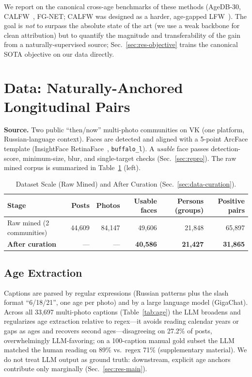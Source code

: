 \documentclass[journal]{IEEEtran}
\begin{document}
We report on the canonical cross-age benchmarks of these methods (AgeDB-30, CALFW~\cite{zheng2017calfw}, FG-NET; CALFW was designed as a harder, age-gapped LFW~\cite{huang2007lfw}). The goal is \emph{not} to surpass the absolute state of the art (we use a weak backbone for clean attribution) but to quantify the magnitude and transferability of the gain from a naturally-supervised source; Sec.~\ref{sec:res-objective} trains the canonical SOTA objective on our data directly.

\section{Data: Naturally-Anchored Longitudinal Pairs}\label{sec:data}
\textbf{Source.} Two public ``then/now'' multi-photo communities on VK (one platform, Russian-language context). Faces are detected and aligned with a 5-point ArcFace template (InsightFace RetinaFace~\cite{deng2020retinaface}, \texttt{buffalo\_l}). A \emph{usable} face passes detection-score, minimum-size, blur, and single-target checks (Sec.~\ref{sec:repro}). The raw mined corpus is summarized in Table~\ref{tab:scale} (left).

\begin{table}[!t]
\renewcommand{\arraystretch}{1.2}
\caption{Dataset Scale (Raw Mined) and After Curation (Sec.~\ref{sec:data-curation}).}
\label{tab:scale}
\centering
\footnotesize
\begin{tabular}{@{}lrrrrr@{}}
\toprule
Stage & Posts & Photos & Usable faces & Persons (groups) & Positive pairs \\
\midrule
Raw mined (2 communities) & 44{,}609 & 84{,}147 & 49{,}606 & 21{,}848 & 65{,}897 \\
\textbf{After curation} & --- & --- & \textbf{40{,}586} & \textbf{21{,}427} & \textbf{31{,}865} \\
\bottomrule
\end{tabular}
\end{table}

\subsection{Age Extraction}\label{sec:data-age}
Captions are parsed by regular expressions (Russian patterns plus the slash format ``6/18/21'', one age per photo) and by a large language model (GigaChat). Across all 33{,}697 multi-photo captions (Table~\ref{tab:age}) the LLM broadens and regularizes age extraction relative to regex---it avoids reading calendar years or gaps as ages and recovers second ages---disagreeing on 27.2\% of posts, overwhelmingly LLM-favoring; on a 100-caption manual gold subset the LLM matched the human reading on 89\% vs.\ regex 71\% (supplementary material). We do not treat LLM output as ground truth: downstream, explicit age anchors contribute only marginally (Sec.~\ref{sec:res-main}).
\end{document}
